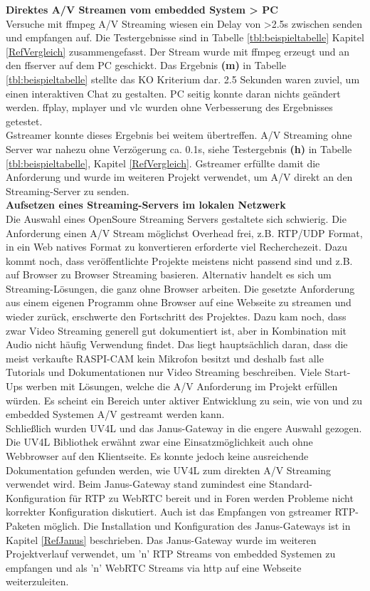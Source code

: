 \textbf{Direktes A/V Streamen vom embedded System > PC}\\
Versuche mit ffmpeg A/V Streaming wiesen ein Delay von >2.5s zwischen senden und empfangen auf. Die Testergebnisse sind in Tabelle \ref{tbl:beispieltabelle}  Kapitel \ref{RefVergleich} zusammengefasst. Der Stream wurde mit ffmpeg erzeugt und an den ffserver auf dem PC geschickt. Das Ergebnis \textbf{(m)} in Tabelle \ref{tbl:beispieltabelle} stellte das KO Kriterium dar. 2.5 Sekunden waren zuviel, um einen interaktiven Chat zu gestalten. PC seitig konnte daran nichts geändert werden. ffplay, mplayer und vlc wurden ohne Verbesserung des Ergebnisses getestet.\\
Gstreamer konnte dieses Ergebnis bei weitem übertreffen. A/V Streaming ohne Server war nahezu ohne Verzögerung ca. 0.1s, siehe Testergebnis \textbf{(h)} in Tabelle \ref{tbl:beispieltabelle}, Kapitel \ref{RefVergleich}. Gstreamer erfüllte damit die Anforderung und wurde im weiteren Projekt verwendet, um A/V direkt an den Streaming-Server zu senden.\\

\textbf{Aufsetzen eines Streaming-Servers im lokalen Netzwerk}\\
Die Auswahl eines OpenSoure Streaming Servers gestaltete sich schwierig. Die Anforderung einen A/V Stream möglichst Overhead frei, z.B. RTP/UDP Format, in ein Web natives Format zu konvertieren erforderte viel Recherchezeit. Dazu kommt noch, dass veröffentlichte Projekte meistens nicht passend sind und z.B. auf Browser zu Browser Streaming basieren. Alternativ handelt es sich um Streaming-Lösungen, die ganz ohne Browser arbeiten. Die gesetzte Anforderung aus einem eigenen Programm ohne Browser auf eine Webseite zu streamen und wieder zurück, erschwerte den Fortschritt des Projektes. Dazu kam noch, dass zwar Video Streaming generell gut dokumentiert ist, aber in Kombination mit Audio nicht häufig Verwendung findet. Das liegt hauptsächlich daran, dass die meist verkaufte RASPI-CAM kein Mikrofon besitzt und deshalb fast alle Tutorials und Dokumentationen nur Video Streaming beschreiben. Viele Start-Ups werben mit Lösungen, welche die A/V Anforderung im Projekt erfüllen würden. Es scheint ein Bereich unter aktiver Entwicklung zu sein, wie von und zu embedded Systemen A/V gestreamt werden kann.\\
Schließlich wurden UV4L und das Janus-Gateway in die engere Auswahl gezogen. Die UV4L Bibliothek erwähnt zwar eine Einsatzmöglichkeit auch ohne Webbrowser auf den Klientseite. Es konnte jedoch keine ausreichende Dokumentation gefunden werden, wie UV4L zum direkten A/V Streaming verwendet wird. Beim Janus-Gateway stand zumindest eine Standard-Konfiguration für RTP zu WebRTC bereit und in Foren werden Probleme nicht korrekter Konfiguration diskutiert. Auch ist das Empfangen von gstreamer RTP-Paketen möglich. Die Installation und Konfiguration des Janus-Gateways ist in Kapitel \ref{RefJanus} beschrieben. Das Janus-Gateway wurde im weiteren Projektverlauf verwendet, um 'n' RTP Streams von embedded Systemen zu empfangen und als 'n' WebRTC Streams via http auf eine Webseite weiterzuleiten.\\

